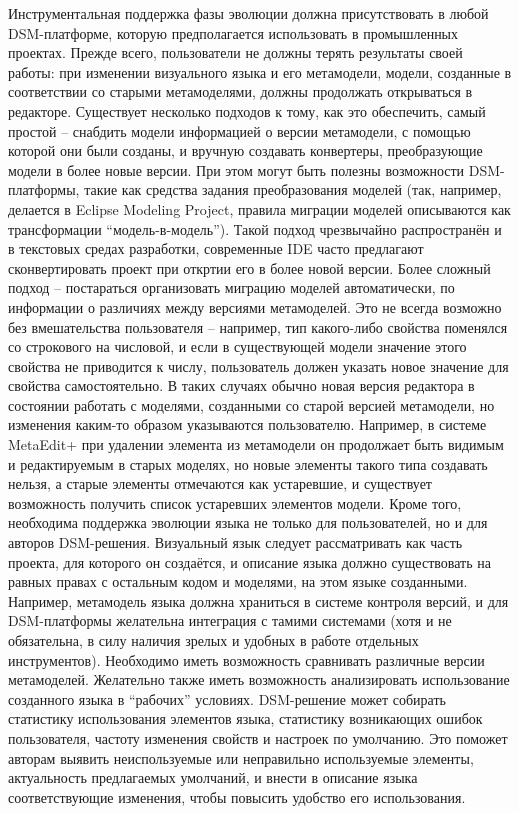 	Инструментальная поддержка фазы эволюции должна присутствовать в любой DSM-платформе, которую предполагается использовать в промышленных проектах. Прежде всего, пользователи не должны терять результаты своей работы: при изменении визуального языка и его метамодели, модели, созданные в соответствии со старыми метамоделями, должны продолжать открываться в редакторе. Существует несколько подходов к тому, как это обеспечить, самый простой – снабдить модели информацией о версии метамодели, с помощью которой они были созданы, и вручную создавать конвертеры, преобразующие модели в более новые версии. При этом могут быть полезны возможности DSM-платформы, такие как средства задания преобразования моделей (так, например, делается в Eclipse Modeling Project, правила миграции моделей описываются как трансформации “модель-в-модель”). Такой подход чрезвычайно распространён и в текстовых средах разработки, современные IDE часто предлагают сконвертировать проект при откртии его в более новой версии. Более сложный подход – постараться организовать миграцию моделей автоматически, по информации о различиях между версиями метамоделей. Это не всегда возможно без вмешательства пользователя – например, тип какого-либо свойства поменялся со строкового на числовой, и если в существующей модели значение этого свойства не приводится к числу, пользователь должен указать новое значение для свойства самостоятельно. В таких случаях обычно новая версия редактора в состоянии работать с моделями, созданными со старой версией метамодели, но изменения каким-то образом указываются пользователю. Например, в системе MetaEdit+ при удалении элемента из метамодели он продолжает быть видимым и редактируемым в старых моделях, но новые элементы такого типа создавать нельзя, а старые элементы отмечаются как устаревшие, и существует возможность получить список устаревших элементов модели.
	Кроме того, необходима поддержка эволюции языка не только для пользователей, но и для авторов DSM-решения. Визуальный язык следует рассматривать как часть проекта, для которого он создаётся, и описание языка должно существовать на равных правах с остальным кодом и моделями, на этом языке созданными. Например, метамодель языка должна храниться в системе контроля версий, и для DSM-платформы желательна интеграция с тамими системами (хотя и не обязательна, в силу наличия зрелых и удобных в работе отдельных инструментов). Необходимо иметь возможность сравнивать различные версии метамоделей.
	Желательно также иметь возможность анализировать использование созданного языка в “рабочих” условиях. DSM-решение может собирать статистику использования элементов языка, статистику возникающих ошибок пользователя, частоту изменения свойств и настроек по умолчанию. Это поможет авторам выявить неиспользуемые или неправильно используемые элементы, актуальность предлагаемых умолчаний, и внести в описание языка соответствующие изменения, чтобы повысить удобство его использования.
